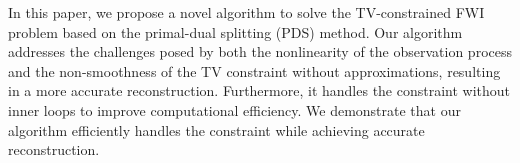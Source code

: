In this paper, we propose a novel algorithm to solve the TV-constrained FWI problem based on the primal-dual splitting (PDS) method.
Our algorithm addresses the challenges posed by both the nonlinearity of the observation process and the non-smoothness of the TV constraint without approximations, resulting in a more accurate reconstruction.
Furthermore, it handles the constraint without inner loops to improve computational efficiency.
We demonstrate that our algorithm efficiently handles the constraint while achieving accurate reconstruction.

